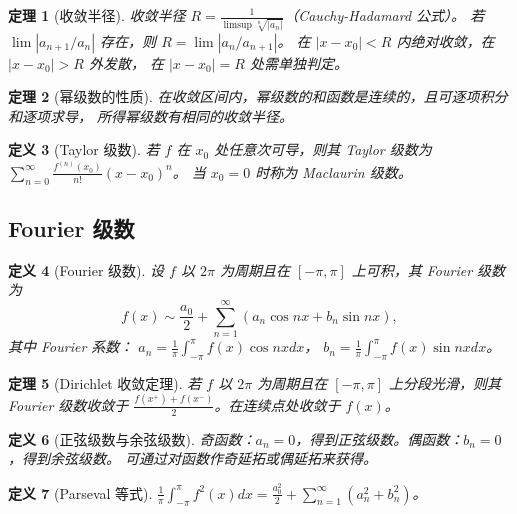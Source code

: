 \documentclass[12pt,a4paper]{ctexart}
\newtheorem{theorem}{定理}[section]
\newtheorem{definition}[theorem]{定义}
\theoremstyle{remark}
\begin{document}
\begin{theorem}[收敛半径]
收敛半径 $R = \frac{1}{\limsup \sqrt[n]{|a_n|}}$（Cauchy-Hadamard 公式）。
若 $\lim |a_{n+1}/a_n|$ 存在，则 $R = \lim |a_n/a_{n+1}|$。
在 $|x-x_0| < R$ 内绝对收敛，在 $|x-x_0| > R$ 外发散，
在 $|x-x_0| = R$ 处需单独判定。
\end{theorem}

\begin{theorem}[幂级数的性质]
在收敛区间内，幂级数的和函数是连续的，且可逐项积分和逐项求导，
所得幂级数有相同的收敛半径。
\end{theorem}

\begin{definition}[Taylor 级数]
若 $f$ 在 $x_0$ 处任意次可导，则其 Taylor 级数为
$\sum_{n=0}^{\infty} \frac{f^{(n)}(x_0)}{n!}(x-x_0)^n$。
当 $x_0=0$ 时称为 Maclaurin 级数。
\end{definition}

\subsection{Fourier 级数}

\begin{definition}[Fourier 级数]
设 $f$ 以 $2\pi$ 为周期且在 $[-\pi,\pi]$ 上可积，其 Fourier 级数为
\[
f(x) \sim \frac{a_0}{2} + \sum_{n=1}^{\infty} (a_n \cos nx + b_n \sin nx),
\]
其中 Fourier 系数：
$a_n = \frac{1}{\pi}\int_{-\pi}^{\pi} f(x) \cos nx dx$，
$b_n = \frac{1}{\pi}\int_{-\pi}^{\pi} f(x) \sin nx dx$。
\end{definition}

\begin{theorem}[Dirichlet 收敛定理]
若 $f$ 以 $2\pi$ 为周期且在 $[-\pi,\pi]$ 上分段光滑，则其 Fourier 级数收敛于
$\frac{f(x^+)+f(x^-)}{2}$。在连续点处收敛于 $f(x)$。
\end{theorem}

\begin{definition}[正弦级数与余弦级数]
奇函数：$a_n=0$，得到正弦级数。偶函数：$b_n=0$，得到余弦级数。
可通过对函数作奇延拓或偶延拓来获得。
\end{definition}

\begin{definition}[Parseval 等式]
$\frac{1}{\pi}\int_{-\pi}^{\pi} f^2(x) dx = \frac{a_0^2}{2} + \sum_{n=1}^{\infty} (a_n^2+b_n^2)$。
\end{definition}
\end{document}
